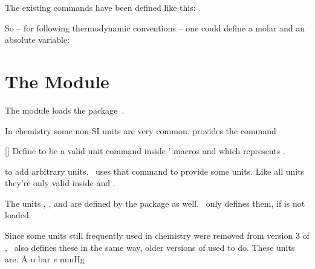 \documentclass{chemmacros-manual}
\begin{document}
The existing commands have been defined like this:
\begin{sourcecode}
  \NewChemState {}
  \NewChemState {}
  \NewChemState {}
\end{sourcecode}

So -- for following thermodynamic conventions -- one could define a molar and
an absolute variable:
\begin{example}
  \RenewChemState{}%
  \NewChemState{}%
   
\end{example}

\section{The  Module}\label{sec:units-module}

The  module loads the 
package~\cite{pkg:siunitx}.

In chemistry some non-SI units are very common.   provides the
command
\begin{commands}
  []
    Define  to be a valid unit command inside ' macros
     and  which represents .
\end{commands}
to add arbitrary units.  \chemmacros\ uses that command to provide some
units.  Like all  units they're only valid inside
 and .
\begin{commands}
   \unit{\atmosphere}
   \unit{\atm}
   \unit{\calory}
   \unit{\cal}
   \unit{\cmc} \par
    The units , , and  are defined by the
    package  as well.  \chemmacros\ only defines them, if
     is not loaded.
   \unit{\molar}
   \unit{\moLar}
   \unit{\Molar}
   \unit{\MolMass}
   \unit{\normal}
   \unit{\torr} 
  \par
{}    Since some units still frequently used in chemistry were removed from version 3 of , 
   \chemmacros\ also defines these in the same way, older versions of  used to do. 
    These units are:
   \unit{\angstrom}
   \unit{\atomicmassunit}
   \unit{\bar}
   \unit{\elementarycharge}
   \unit{\mmHg}
\end{commands}
\end{document}
